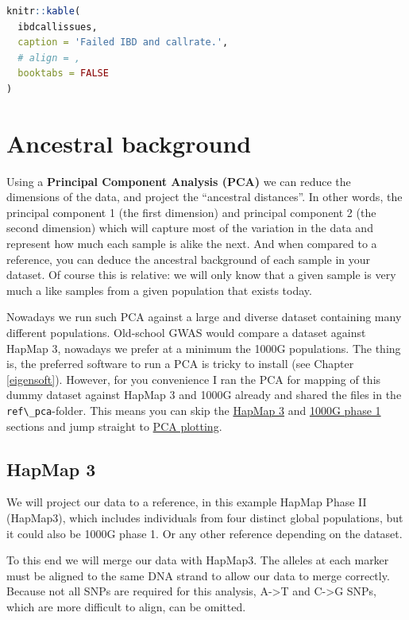 \documentclass[
]{book}
\newcommand{\passthrough}[1]{#1}
\begin{document}
\begin{lstlisting}[language=R]
knitr::kable(
  ibdcallissues, 
  caption = 'Failed IBD and callrate.',
  # align = ,
  booktabs = FALSE
)
\end{lstlisting}

\hypertarget{ancestral-background}{%
\section{Ancestral background}\label{ancestral-background}}

Using a \textbf{Principal Component Analysis (PCA)} we can reduce the dimensions of the data, and project the ``ancestral distances''. In other words, the principal component 1 (the first dimension) and principal component 2 (the second dimension) which will capture most of the variation in the data and represent how much each sample is alike the next. And when compared to a reference, you can deduce the ancestral background of each sample in your dataset. Of course this is relative: we will only know that a given sample is very much a like samples from a given population that exists today.

Nowadays we run such PCA against a large and diverse dataset containing many different populations. Old-school GWAS would compare a dataset against HapMap 3, nowadays we prefer at a minimum the 1000G populations. The thing is, the preferred software to run a PCA is tricky to install (see Chapter \ref{eigensoft}).
However, for you convenience I ran the PCA for mapping of this dummy dataset against HapMap 3 and 1000G already and shared the files in the \passthrough{\lstinline!ref\_pca!}-folder. This means you can skip the \protect\hyperlink{hapmap-3}{HapMap 3} and \protect\hyperlink{g-phase-1}{1000G phase 1} sections and jump straight to \protect\hyperlink{pca-plotting}{PCA plotting}.

\hypertarget{hapmap-3}{%
\subsection{HapMap 3}\label{hapmap-3}}

We will project our data to a reference, in this example HapMap Phase II (HapMap3), which includes individuals from four distinct global populations, but it could also be 1000G phase 1. Or any other reference depending on the dataset.

To this end we will merge our data with HapMap3. The alleles at each marker must be aligned to the same DNA strand to allow our data to merge correctly. Because not all SNPs are required for this analysis, A-\textgreater T and C-\textgreater G SNPs, which are more difficult to align, can be omitted.
\end{document}

